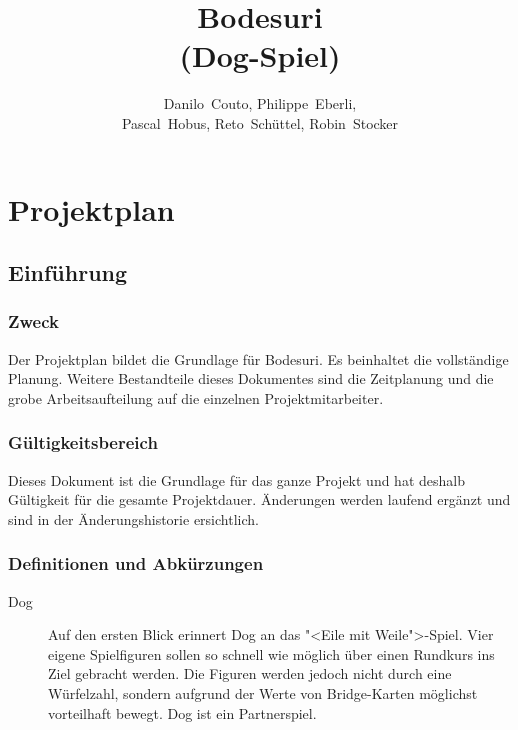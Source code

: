 \documentclass[a4paper,12pt,halfparskip,DIV14]{scrreprt}
\begin{document}
\title{Bodesuri \\ (Dog-Spiel)}
\subject{SE2-Projekt}
\author{Danilo~Couto, Philippe~Eberli, \\ Pascal~Hobus, Reto~Schüttel, Robin~Stocker}
\maketitle


\tableofcontents
\thispagestyle{plain}
\newpage



\chapter{Projektplan}


\section{Einführung}

\subsection{Zweck}

Der Projektplan bildet die Grundlage für Bodesuri. Es beinhaltet die vollständige Planung. Weitere Bestandteile dieses Dokumentes sind die Zeitplanung und die grobe Arbeitsaufteilung auf die einzelnen Projektmitarbeiter.

\subsection{Gültigkeitsbereich}

Dieses Dokument ist die Grundlage für das ganze Projekt und hat deshalb Gültigkeit für die gesamte Projektdauer. Änderungen werden laufend ergänzt und sind in der Änderungshistorie ersichtlich.

\subsection{Definitionen und Abkürzungen}

\begin{description}
	\item[Dog] Auf den ersten Blick erinnert Dog an das "<Eile mit Weile">-Spiel. Vier eigene Spielfiguren sollen so schnell wie möglich über einen Rundkurs ins Ziel gebracht werden. Die Figuren werden jedoch nicht durch eine Würfelzahl, sondern aufgrund der Werte von Bridge-Karten möglichst vorteilhaft bewegt. Dog ist ein Partnerspiel.
\end{description}
\end{document}
